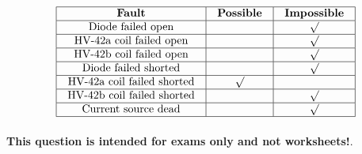 

$$\vbox{\offinterlineskip
\halign{\strut
\vrule \quad\hfil # \ \hfil & 
\vrule \quad\hfil # \ \hfil & 
\vrule \quad\hfil # \ \hfil \vrule \cr
\noalign{\hrule}
%
{\bf Fault} & {\bf Possible} & {\bf Impossible} \cr
%
\noalign{\hrule}
%
Diode failed open &  & $\surd$ \cr
%
\noalign{\hrule}
%
HV-42a coil failed open &  & $\surd$ \cr
%
\noalign{\hrule}
%
HV-42b coil failed open &  & $\surd$ \cr
%
\noalign{\hrule}
%
Diode failed shorted &  & $\surd$ \cr
%
\noalign{\hrule}
%
HV-42a coil failed shorted & $\surd$ &  \cr
%
\noalign{\hrule}
%
HV-42b coil failed shorted &  & $\surd$ \cr
%
\noalign{\hrule}
%
Current source dead &  & $\surd$ \cr
%
\noalign{\hrule}
} %
}$$ %







{\bf This question is intended for exams only and not worksheets!}.



